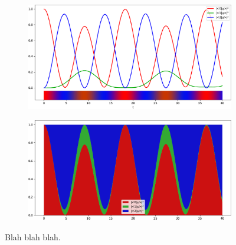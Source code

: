 \begin{figure}[h]
  \centering
  \begin{subfigure}[b]{\textwidth}
    \includegraphics[width=\textwidth]{img/3ldetect/hermitian3lines.pdf}
  \end{subfigure}
  \par\bigskip
  \par\bigskip
  \begin{subfigure}[b]{\textwidth}
    \includegraphics[width=\textwidth]{img/3ldetect/hermitian3color.pdf}
  \end{subfigure}
  \par\bigskip
  \par\bigskip
  \caption{
    Blah blah blah.
  }
  \label{fig:aabsorbed-qubit-components_pwlattice}
\end{figure}



